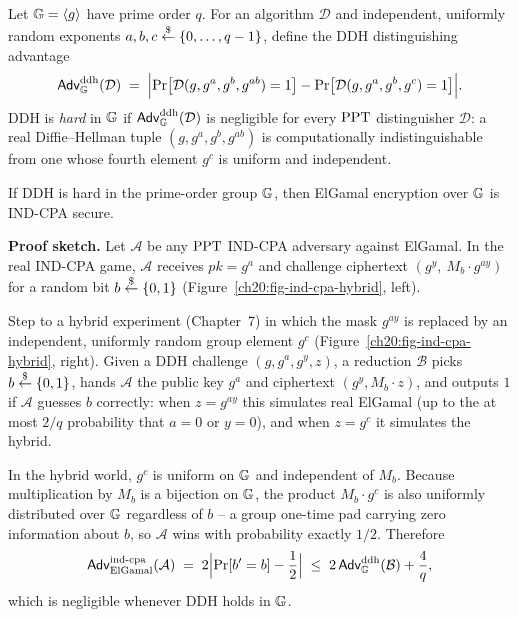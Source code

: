 \begin{definition}
\label{ch20:def-ddh}
Let $\mathbb{G} = \langle g\rangle$ have prime order $q$. For an algorithm $\mathcal{D}$ and independent, uniformly random exponents $a, b, c \stackrel{\$}{\gets} \{0,\dots,q-1\}$, define the DDH distinguishing advantage
\[
  \mathsf{Adv}^{\mathrm{ddh}}_{\mathbb{G}}(\mathcal{D})
  \;=\;
  \Bigl|\Pr\bigl[\mathcal{D}(g, g^{a}, g^{b}, g^{ab}) = 1\bigr]
  - \Pr\bigl[\mathcal{D}(g, g^{a}, g^{b}, g^{c}) = 1\bigr]\Bigr|.
\]
DDH is \emph{hard} in $\mathbb{G}$ if $\mathsf{Adv}^{\mathrm{ddh}}_{\mathbb{G}}(\mathcal{D})$ is negligible for every $\mathrm{PPT}$ distinguisher $\mathcal{D}$: a real Diffie--Hellman tuple $(g, g^a, g^b, g^{ab})$ is computationally indistinguishable from one whose fourth element $g^c$ is uniform and independent.
\end{definition}

\begin{theorem}
\label{ch20:thm-ind-cpa}
If DDH is hard in the prime-order group $\mathbb{G}$, then ElGamal encryption over $\mathbb{G}$ is IND-CPA secure.
\end{theorem}

\begin{whybox}
\textbf{Proof sketch.} Let $\mathcal{A}$ be any $\mathrm{PPT}$ IND-CPA adversary against ElGamal. In the real IND-CPA game, $\mathcal{A}$ receives $pk = g^a$ and challenge ciphertext $(g^y,\ M_b \cdot g^{ay})$ for a random bit $b \stackrel{\$}{\gets} \{0,1\}$ (Figure~\ref{ch20:fig-ind-cpa-hybrid}, left).

Step to a hybrid experiment (Chapter~7) in which the mask $g^{ay}$ is replaced by an independent, uniformly random group element $g^c$ (Figure~\ref{ch20:fig-ind-cpa-hybrid}, right). Given a DDH challenge $(g, g^a, g^y, z)$, a reduction $\mathcal{B}$ picks $b \stackrel{\$}{\gets} \{0,1\}$, hands $\mathcal{A}$ the public key $g^a$ and ciphertext $(g^y, M_b \cdot z)$, and outputs $1$ if $\mathcal{A}$ guesses $b$ correctly: when $z = g^{ay}$ this simulates real ElGamal (up to the at most $2/q$ probability that $a = 0$ or $y = 0$), and when $z = g^c$ it simulates the hybrid.

In the hybrid world, $g^c$ is uniform on $\mathbb{G}$ and independent of $M_b$. Because multiplication by $M_b$ is a bijection on $\mathbb{G}$, the product $M_b \cdot g^c$ is also uniformly distributed over $\mathbb{G}$ regardless of $b$ -- a group one-time pad carrying zero information about $b$, so $\mathcal{A}$ wins with probability exactly $1/2$. Therefore
\[
  \mathsf{Adv}^{\mathrm{ind\text{-}cpa}}_{\mathrm{ElGamal}}(\mathcal{A})
  \;=\;
  2\Bigl|\Pr[b' = b] - \frac{1}{2}\Bigr|
  \;\le\;
  2\,\mathsf{Adv}^{\mathrm{ddh}}_{\mathbb{G}}(\mathcal{B}) + \frac{4}{q},
\]
which is negligible whenever DDH holds in $\mathbb{G}$.
\end{whybox}

